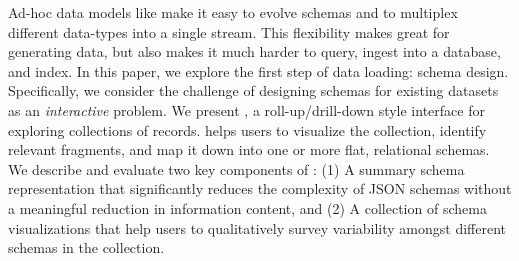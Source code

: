Ad-hoc data models like \json make it easy to evolve schemas and to multiplex different data-types into a single stream.
This flexibility makes \json great for generating data, but also makes it much harder to query, ingest into a database, and index.
In this paper, we explore the first step of \json data loading: schema design.
Specifically, we consider the challenge of designing schemas for existing \json datasets as an \emph{interactive} problem.  
We present \systemnametwo, a roll-up/drill-down style interface for exploring collections of \json records.
\systemnametwo helps users to visualize the collection, identify relevant fragments, and map it down into one or more flat, relational schemas.
We describe and evaluate two key components of \systemnametwo: 
(1) A summary schema representation that significantly reduces the complexity of JSON schemas without a meaningful reduction in information content, 
and (2) A collection of schema visualizations that help users to qualitatively survey variability amongst different schemas in the collection.